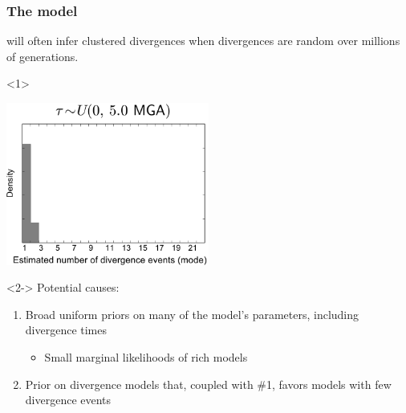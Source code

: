 \begin{frame}[t]
    \frametitle{The \msb model}
    \begin{minipage}[c][0.18\textheight][c]{\linewidth}
        \msb will often infer clustered divergences when divergences are random
        over millions of generations.
    \end{minipage}


    \begin{onlyenv}<1>
        \vspace{-3mm}
        \begin{center}
            \includegraphics[width=0.5\textwidth]{../images/old_old_power_psi_mode_last.pdf}
        \end{center}
    \end{onlyenv}
    \begin{onlyenv}<2->
    Potential causes:
        \begin{enumerate}
            \item Broad uniform priors on many of the model's parameters, including
                divergence times
            \begin{itemize}
                \item Small marginal likelihoods of rich models
            \end{itemize}
            \item Prior on divergence models that, coupled with \#1, favors
                models with few divergence events
        \end{enumerate}
    \end{onlyenv}
\end{frame}

